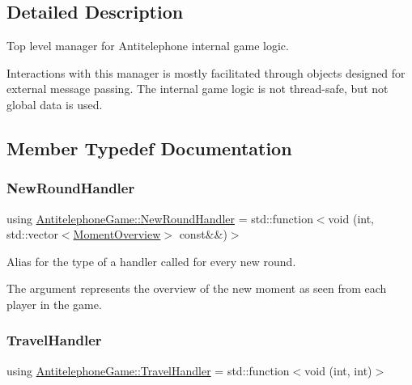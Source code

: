\subsection{Detailed Description}
Top level manager for Antitelephone internal game logic. 

Interactions with this manager is mostly facilitated through objects designed for external message passing. The internal game logic is not thread-\/safe, but not global data is used. 

\subsection{Member Typedef Documentation}
\mbox{\label{class_antitelephone_game_a8133e046c3f00cf8b1b056c6e67666c9}} 
\subsubsection{\texorpdfstring{New\+Round\+Handler}{NewRoundHandler}}
{\footnotesize\ttfamily using \hyperlink{class_antitelephone_game_a8133e046c3f00cf8b1b056c6e67666c9}{Antitelephone\+Game\+::\+New\+Round\+Handler} =  std\+::function$<$void (int, std\+::vector$<$\hyperlink{classexternal_1_1_moment_overview}{Moment\+Overview}$>$ const\&\&)$>$}



Alias for the type of a handler called for every new round. 

The argument represents the overview of the new moment as seen from each player in the game. \mbox{\label{class_antitelephone_game_af20c5801994054663bdb537b40c6683d}} 
\subsubsection{\texorpdfstring{Travel\+Handler}{TravelHandler}}
{\footnotesize\ttfamily using \hyperlink{class_antitelephone_game_af20c5801994054663bdb537b40c6683d}{Antitelephone\+Game\+::\+Travel\+Handler} =  std\+::function$<$void (int, int)$>$}



